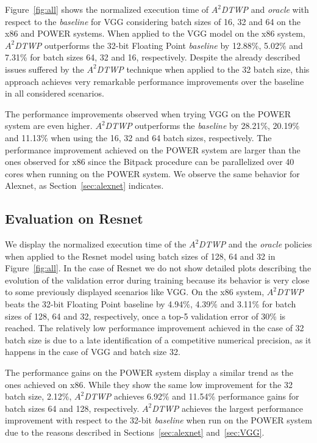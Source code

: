Figure~\ref{fig:all} shows the normalized execution time of \textit{$A^2$DTWP} 
and \textit{oracle} with respect to the \textit{baseline} for VGG considering 
batch sizes of 16, 32 and 64 on the x86 and POWER systems.
When applied to the VGG model on the x86 system, \textit{$A^2$DTWP} outperforms the 32-bit Floating Point \textit{baseline} by 12.88\%, 5.02\% and 7.31\% for batch sizes 64, 32 and 16, respectively.
Despite the already described issues suffered by the \textit{$A^2$DTWP} technique when applied to the 32 batch size, this approach achieves very remarkable performance improvements over the baseline in all considered scenarios. 

The performance improvements observed when trying VGG on the POWER system are even higher.
\textit{$A^2$DTWP} outperforms the \textit{baseline} by 28.21\%, 20.19\% and 11.13\% when using the 16, 32 and 64 batch sizes, respectively.
The performance improvement achieved on the POWER system are larger than the ones observed for x86 since the Bitpack procedure can be parallelized over 40 cores when running on the POWER system.
We observe the same behavior for Alexnet, as Section~\ref{sec:alexnet} indicates.

\subsection{Evaluation on Resnet}
\label{sec:Resnet}
We display the normalized execution time of the \textit{$A^2$DTWP} and the \textit{oracle} policies when applied to the Resnet model using batch sizes of 128, 64 and 32 in Figure~\ref{fig:all}.
In the case of Resnet we do not show detailed plots describing the evolution of 
the validation error during training because its behavior is very close to some previously displayed scenarios like VGG.
On the x86 system, \textit{$A^2$DTWP} beats the 32-bit Floating Point baseline by 4.94\%, 4.39\% and 3.11\% for batch sizes of 128, 64 and 32, respectively, once a top-5 validation error of 30\% is reached.
The relatively low performance improvement achieved in the case of 32 batch size is due to a late identification of a competitive numerical precision, as it happens in the case of VGG and batch size 32.

The performance gains on the POWER system display a similar trend as the ones achieved on x86. 
While they show the same low improvement for the 32 batch size, 2.12\%, \textit{$A^2$DTWP} achieves 6.92\% and 11.54\% performance gains for batch sizes 64 and 128, respectively.
\textit{$A^2$DTWP} achieves the largest performance improvement with respect to the 32-bit \textit{baseline} when run on the POWER system due to the reasons described in Sections~\ref{sec:alexnet} and~\ref{sec:VGG}.


